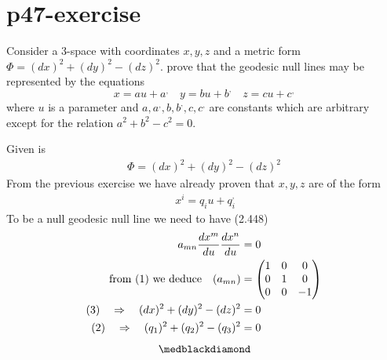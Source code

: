 \section{p47-exercise }
\begin{tcolorbox}
Consider a 3-space with coordinates $x,y,z$ and a metric form $\Phi = (dx)^2+(dy)^2 - (dz)^2$. prove that the geodesic null lines may be represented by the equations
$$x = au + a^,\quad y = bu + b^, \quad z = cu + c^,$$
where $u$ is a parameter and $a, a^,,b,b^,,c,c^,$ are constants which are arbitrary except for the relation $a^2+b^2-c^2 =0$.
\end{tcolorbox}
Given is 
\begin{align}
\Phi = (dx)^2+(dy)^2 - (dz)^2
\end{align}
From the previous exercise we have already proven that $x,y,z$ are of the form
\begin{align}
\ x^i = q_i u + q_i^,
\end{align}
To be a null geodesic null line we need to have (2.448)
\begin{align}
\ a_{mn}\dv{x^m}{u}\dv{x^n}{u} &=0\\
\text{from (1) we deduce}  \quad (a_{mn}) &= \begin{pmatrix}
1& 0 & 0 \\
 0&1  & 0 \\
 0&  0& -1 \\
\end{pmatrix}\\
\text{(3)}\quad\Rightarrow\quad (dx)^2+(dy)^2 - (dz)^2 &=0\\
\text{(2)}\quad\Rightarrow\quad (q_1)^2+(q_2)^2 - (q_3)^2 &=0
\end{align}
$$\medblackdiamond$$
\newpage

